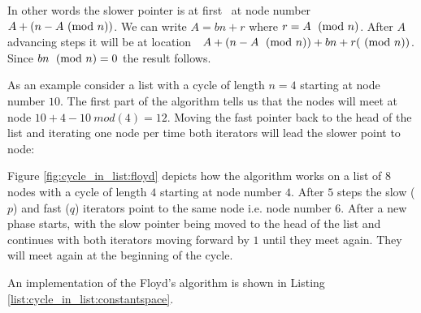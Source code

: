 In other words the slower pointer is at first  at node number \(A+(n-A \ (\mathrm{mod}\ n))\). We can write \( A
= bn + r\) where \(r = A \;\ (\mathrm{mod}\ n)\). After \(A\) advancing steps it will be at location  \( A+(n-A
\;\ (\mathrm{mod}\ n)) +bn +r (\ (\mathrm{mod}\ n))\). Since \(bn \; \ (\mathrm{mod}\ n)=0\) the result follows.

As an example consider a list with a cycle of length \(n=4\) starting at node number \(10\). The
first part of the algorithm tells us that the nodes will meet at node \(10 + 4 - 10 \: mod(4) =
12\). Moving the fast pointer back to the head of the list and iterating one node per time both
iterators will lead the slower point to node:



Figure \ref{fig:cycle_in_list:floyd} depicts how the algorithm
works on a list of $8$ nodes with a cycle of length $4$ starting at node number $4$. 
After $5$ steps the slow ($p$) and fast ($q$) iterators point to the same node i.e. node number $6$. 
After a new phase starts, with the slow pointer being moved to the head of the list and continues with both iterators moving forward by $1$
until they meet again. 
They will meet again at the beginning of the cycle. 

An implementation of the Floyd's algorithm is shown in Listing \ref{list:cycle_in_list:constantspace}.








